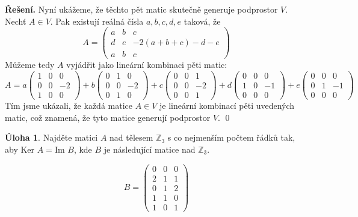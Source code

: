 \documentclass{article}
\theoremstyle{definition}
\newtheorem{uloha}{Úloha}
\theoremstyle{plain}
\newenvironment{reseni}{\noindent\textbf{Řešení.}\hspace{0.5em}}{\hfill\qed\medskip}
\begin{document}
\begin{reseni}
Nyní ukážeme, že těchto pět matic skutečně generuje podprostor $V$. Nechť $A \in V$. Pak existují reálná čísla $a, b, c, d, e$ taková, že
\[
A = \begin{pmatrix}
a & b & c \\
d & e & -2(a + b + c) - d - e \\
a & b & c
\end{pmatrix}
\]
Můžeme tedy $A$ vyjádřit jako lineární kombinaci pěti matic:
\[
A = a \begin{pmatrix}
1 & 0 & 0 \\
0 & 0 & -2 \\
1 & 0 & 0
\end{pmatrix} + b \begin{pmatrix}
0 & 1 & 0 \\
0 & 0 & -2 \\
0 & 1 & 0
\end{pmatrix} + c \begin{pmatrix}
0 & 0 & 1 \\
0 & 0 & -2 \\
0 & 0 & 1
\end{pmatrix} + d \begin{pmatrix}
0 & 0 & 0 \\
1 & 0 & -1 \\
0 & 0 & 0
\end{pmatrix} + e \begin{pmatrix}
0 & 0 & 0 \\
0 & 1 & -1 \\
0 & 0 & 0
\end{pmatrix}
\]
Tím jsme ukázali, že každá matice $A \in V$ je lineární kombinací pěti uvedených matic, což znamená, že tyto matice generují podprostor $V$.
\end{reseni}
\newpage
\begin{uloha}
Najděte matici $A$ nad tělesem $\mathbb{Z}_3$ s co nejmenším počtem řádků tak, aby $\text{Ker } A = \text{Im } B$, kde $B$ je následující matice nad $\mathbb{Z}_3$.

\[
B = \begin{pmatrix}
0 & 0 & 0 \\
2 & 1 & 1 \\
0 & 1 & 2 \\
1 & 1 & 0 \\
1 & 0 & 1
\end{pmatrix}
\]
\end{uloha}
\end{document}
